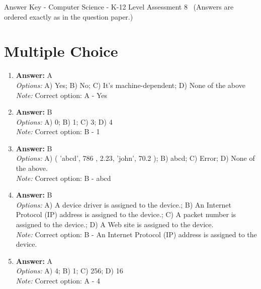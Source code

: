 \documentclass[12pt]{article}
\begin{document}
\begin{center}
Answer Key - Computer Science - K-12 Level Assessment 8 \
\small (Answers are ordered exactly as in the question paper.)
\end{center}

\section*{Multiple Choice}
\begin{enumerate}[label=\arabic*.]
\item \textbf{Answer:} A
\\ \textit{Options:} A) Yes; B) No; C) It's machine-dependent; D) None of the above
\\ \textit{Note:} Correct option: A - Yes
\item \textbf{Answer:} B
\\ \textit{Options:} A) 0; B) 1; C) 3; D) 4
\\ \textit{Note:} Correct option: B - 1
\item \textbf{Answer:} B
\\ \textit{Options:} A) ( 'abcd', 786 , 2.23, 'john', 70.2 ); B) abcd; C) Error; D) None of the above.
\\ \textit{Note:} Correct option: B - abcd
\item \textbf{Answer:} B
\\ \textit{Options:} A) A device driver is assigned to the device.; B) An Internet Protocol (IP) address is assigned to the device.; C) A packet number is assigned to the device.; D) A Web site is assigned to the device.
\\ \textit{Note:} Correct option: B - An Internet Protocol (IP) address is assigned to the device.
\item \textbf{Answer:} A
\\ \textit{Options:} A) 4; B) 1; C) 256; D) 16
\\ \textit{Note:} Correct option: A - 4
\end{enumerate}
\end{document}
